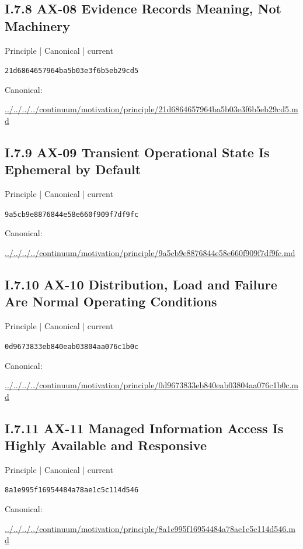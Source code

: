 \documentclass[10pt,a4paper]{article}
\begin{document}
\subsection*{I.7.8 AX-08 Evidence Records Meaning, Not Machinery}
{\small Principle | Canonical | current}\par
\texttt{21d6864657964ba5b03e3f6b5eb29cd5}\par
Canonical: \par
{\footnotesize\url{../../../../continuum/motivation/principle/21d6864657964ba5b03e3f6b5eb29cd5.md}}\par
\subsection*{I.7.9 AX-09 Transient Operational State Is Ephemeral by Default}
{\small Principle | Canonical | current}\par
\texttt{9a5cb9e8876844e58e660f909f7df9fc}\par
Canonical: \par
{\footnotesize\url{../../../../continuum/motivation/principle/9a5cb9e8876844e58e660f909f7df9fc.md}}\par
\subsection*{I.7.10 AX-10 Distribution, Load and Failure Are Normal Operating Conditions}
{\small Principle | Canonical | current}\par
\texttt{0d9673833eb840eab03804aa076c1b0c}\par
Canonical: \par
{\footnotesize\url{../../../../continuum/motivation/principle/0d9673833eb840eab03804aa076c1b0c.md}}\par
\subsection*{I.7.11 AX-11 Managed Information Access Is Highly Available and Responsive}
{\small Principle | Canonical | current}\par
\texttt{8a1e995f16954484a78ae1c5c114d546}\par
Canonical: \par
{\footnotesize\url{../../../../continuum/motivation/principle/8a1e995f16954484a78ae1c5c114d546.md}}\par
\end{document}
